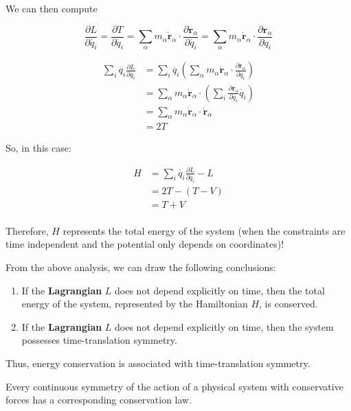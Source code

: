 We can then compute

\begin{equation}
    \frac{\partial L}{\partial \dot{q_i}} = \frac{\partial T}{\partial \dot{q_i}} = \sum_\alpha m_\alpha \dot{\mathbf{r}}_\alpha \cdot \frac{\partial \dot{\mathbf{r}}_\alpha}{\partial \dot{q_i}} = \sum_\alpha m_\alpha \dot{\mathbf{r}}_\alpha \cdot \frac{\partial \mathbf{r}_\alpha}{\partial q_i}
\end{equation}

\begin{align}
    \sum_i \dot{q_i} \frac{\partial L}{\partial \dot{q_i}} &= \sum_i \dot{q_i} \left(\sum_\alpha m_\alpha \dot{\mathbf{r}}_\alpha \cdot \frac{\partial \mathbf{r}_\alpha}{\partial q_i}\right) \\
    &= \sum_\alpha m_\alpha \dot{\mathbf{r}}_\alpha \cdot \left(\sum_i \frac{\partial \mathbf{r}_\alpha}{\partial q_i} \dot{q_i}\right) \\
    &= \sum_\alpha m_\alpha \dot{\mathbf{r}}_\alpha \cdot \dot{\mathbf{r}}_\alpha \\
    &= 2T
\end{align}

So, in this case:

\begin{align}
    H &= \sum_i \dot{q_i} \frac{\partial L}{\partial \dot{q_i}} - L \\
    &= 2T - \left(T - V\right) \\
    &= T + V \\
\end{align}

Therefore, $H$ represents the total energy of the system (when the constraints are time independent and the potential only depends on coordinates)!

From the above analysis, we can draw the following conclusions:

\begin{enumerate}
    \item If the \textbf{Lagrangian} $L$ does not depend explicitly on time, then the total energy of the system, represented by the Hamiltonian $H$, is conserved.
    \item If the \textbf{Lagrangian} $L$ does not depend explicitly on time, then the system possesses time-translation symmetry.
\end{enumerate}

Thus, energy conservation is associated with time-translation symmetry.

\begin{definition}
    Every continuous symmetry of the action of a physical system with conservative forces has a corresponding conservation law.
\end{definition}


